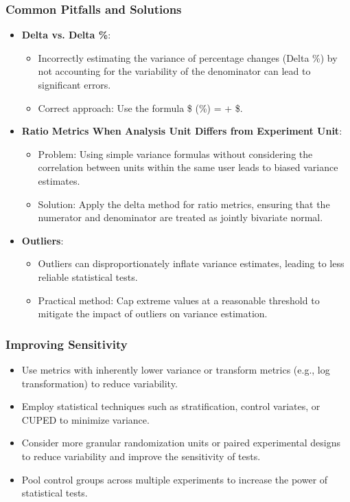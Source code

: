 \documentclass{article}
\begin{document}
\subsubsection*{Common Pitfalls and Solutions}
\begin{itemize}
    \item \textbf{Delta vs. Delta \%}: 
    \begin{itemize}
        \item Incorrectly estimating the variance of percentage changes (Delta \%) by not accounting for the variability of the denominator can lead to significant errors.
        \item Correct approach: Use the formula \$ (\Delta\%) =  +  \$.
    \end{itemize}

    \item \textbf{Ratio Metrics When Analysis Unit Differs from Experiment Unit}:
    \begin{itemize}
        \item Problem: Using simple variance formulas without considering the correlation between units within the same user leads to biased variance estimates.
        \item Solution: Apply the delta method for ratio metrics, ensuring that the numerator and denominator are treated as jointly bivariate normal.
    \end{itemize}

    \item \textbf{Outliers}:
    \begin{itemize}
        \item Outliers can disproportionately inflate variance estimates, leading to less reliable statistical tests.
        \item Practical method: Cap extreme values at a reasonable threshold to mitigate the impact of outliers on variance estimation.
    \end{itemize}
\end{itemize}

\subsubsection*{Improving Sensitivity}
\begin{itemize}
    \item Use metrics with inherently lower variance or transform metrics (e.g., log transformation) to reduce variability.
    \item Employ statistical techniques such as stratification, control variates, or CUPED to minimize variance.
    \item Consider more granular randomization units or paired experimental designs to reduce variability and improve the sensitivity of tests.
    \item Pool control groups across multiple experiments to increase the power of statistical tests.
\end{itemize}
\end{document}
